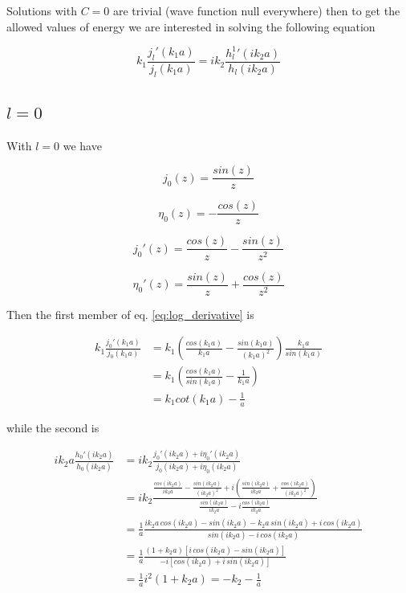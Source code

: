 \documentclass{article}
\begin{document}
Solutions with \( C = 0 \) are trivial (wave function null everywhere) then to get the allowed values of energy we are interested in solving the following equation

\begin{equation}
\label{eq:log_derivative}
k_1 \frac{j_l'(k_1a)}{j_l(k_1a)} = i k_2 \frac{{h_l^1}'(ik_2a)}{h_l(ik_2a)}
\end{equation}

\subsection{ \( l = 0 \) }

With \( l= 0 \) we have

\begin{equation}
j_0(z) = \frac{sin(z)}{z}
\end{equation}

\begin{equation}
\eta_0(z) = - \frac{cos(z)}{z}
\end{equation}

\begin{equation}
j_0'(z) = \frac{cos(z)}{z} -  \frac{sin(z)}{z^2}
\end{equation}

\begin{equation}
\eta_0'(z) = \frac{sin(z)}{z} + \frac{cos(z)}{z^2}
\end{equation}

Then the first member of eq. \eqref{eq:log_derivative} is

\begin{align}
k_1 \frac{j_0'(k_1a)}{j_0(k_1a)} & = k_1 \left( \frac{cos(k_1a)}{k_1a} - \frac{sin(k_1a)}{(k_1a)^2} \right) \frac{k_1a}{sin(k_1a)} \nonumber \\
& = k_1 \left( \frac{cos(k_1a)}{sin(k_1a)} - \frac{1}{k_1a} \right) \nonumber \\
& = k_1 cot(k_1a) - \frac{1}{a}
\end{align}

while the second is

\begin{align}
ik_2a \frac{h_0'(ik_2a)}{h_0(ik_2a)} & = ik_2 \frac{j_0'(ik_2a) + i \eta_0'(ik_2a)}{j_0(ik_2a) + i\eta_0(ik_2a)} \nonumber \\
& = ik_2 \frac{\frac{cos(ik_2a)}{ik_2a} - \frac{sin(ik_2a)}{(ik_2a)^2} + i \left( \frac{sin(ik_2a)}{ik_2a} + \frac{cos(ik_2a)}{(ik_2a)^2} \right)}{\frac{sin(ik_2a)}{ik_2a} -i \frac{cos(ik_2a)}{ik_2a}} \nonumber \\
& = \frac{1}{a} \frac{ik_2a \, cos(ik_2a) - sin(ik_2a) - k_2a \, sin(ik_2a) + i \, cos(ik_2a)}{sin(ik_2a) - i \, cos(ik_2a)} \nonumber \\
& = \frac{1}{a} \frac{(1+k_2a) \left[ i \, cos(ik_2a) - sin(ik_2a) \right]}{-i \left[ cos(ik_2a) + i \, sin(ik_2a) \right]} \nonumber \\
& = \frac{1}{a} i^2 (1 + k_2a) = -k_2 - \frac{1}{a}
\end{align}
\end{document}
